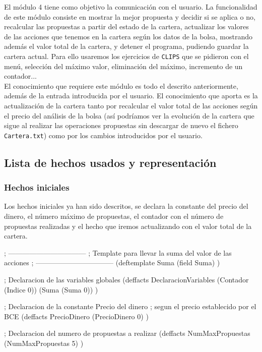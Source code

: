 \documentclass[11pt,leqno]{article}
\theoremstyle{definition_wo_parentheses}
\theoremstyle{plain}
\theoremstyle{remark}
\begin{document}
	El módulo 4 tiene como objetivo la comunicación con el usuario. La funcionalidad de este módulo consiste en mostrar la mejor propuesta y decidir si se aplica o no, recalcular las propuestas a partir del estado de la cartera, actualizar los valores de las acciones que tenemos en la cartera según los datos de la bolsa, mostrando además el valor total de la cartera, y detener el programa, pudiendo guardar la cartera actual. Para ello usaremos los ejercicios de \texttt{CLIPS} que se pidieron con el menú, selección del máximo valor, eliminación del máximo, incremento de un contador...\\
	El conocimiento que requiere este módulo es todo el descrito anteriormente, además de la entrada introducida por el usuario. El conocimiento que aporta es la actualización de la cartera tanto por recalcular el valor total de las acciones según el precio del análisis de la bolsa (así podríamos ver la evolución de la cartera que sigue al realizar las operaciones propuestas sin descargar de nuevo el fichero \texttt{Cartera.txt}) como por los cambios introducidos por el usuario.
	
	
\subsection{Lista de hechos usados y representación}

\subsubsection{Hechos iniciales}

	Los hechos iniciales ya han sido descritos, se declara la constante del precio del dinero, el número máximo de propuestas, el contador con el número de propuestas realizadas y el hecho que iremos actualizando con el valor total de la cartera.
	
\begin{clips-code}
; ---------------------------------
; Template para llevar la suma del valor de las acciones
; ---------------------------------
(deftemplate Suma
  (field Suma)
)

; Declaracion de las variables globales
(deffacts DeclaracionVariables
  (Contador (Indice 0))
  (Suma (Suma 0))
)

; Declaracion de la constante Precio del dinero
;   segun el precio establecido por el BCE
(deffacts PrecioDinero
  (PrecioDinero 0)
)

; Declaracion del numero de propuestas a realizar
(deffacts NumMaxPropuestas
  (NumMaxPropuestas 5)
)
\end{clips-code}
\end{document}
